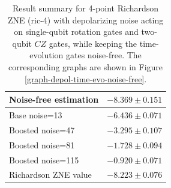 \begin{table}
\caption{Result summary for 4-point Richardson ZNE (ric-4) with depolarizing noise acting on single-qubit rotation gates and two-qubit $CZ$ gates, while keeping the time-evolution gates noise-free. The corresponding graphs are shown in Figure \ref{graph-depol-time-evo-noise-free}.}
\begin{tabular*}{\textwidth}{@{\extracolsep{\fill}}ll@{}}
\toprule

Noise-free estimation & $-8.369 \pm 0.151$ \\
\midrule
Base noise=13 & $-6.436 \pm 0.071$ \\
Boosted noise=47 & $-3.295 \pm 0.107$ \\
Boosted noise=81 & $-1.728 \pm 0.094$ \\
Boosted noise=115 & $-0.920 \pm 0.071$ \\
\midrule
Richardson ZNE value & $-8.223 \pm 0.076$ \\
\bottomrule
\end{tabular*}
\label{table-depol-noise-free-time-evo}
\end{table}
